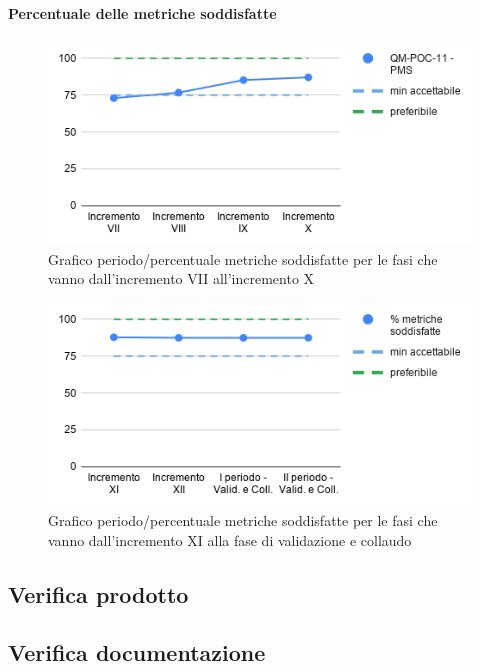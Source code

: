 \paragraph{Percentuale delle metriche soddisfatte}
	\begin{figure}[H]
			\centering
			\includegraphics[width=0.8\linewidth]{./res/images/QM-PROC-11-PMS.png}
			\caption{Grafico periodo/percentuale metriche soddisfatte per le fasi che vanno dall'incremento VII all'incremento X}
			\label{fig:Grafico periodo/percentuale metriche soddisfatte per le fasi che vanno dall'incremento VII all'incremento X}
	\end{figure}
	\begin{figure}[H]
			\centering
			\includegraphics[width=0.8\linewidth]{./res/images/QM-PROC-11-PMS_1.png}
			\caption{Grafico periodo/percentuale metriche soddisfatte per le fasi che vanno dall'incremento XI alla fase di validazione e collaudo}
			\label{fig:Grafico periodo/percentuale metriche soddisfatte per le fasi che vanno dall'incremento XI alla fase di validazione e collaudo}
	\end{figure}

\subsection{Verifica prodotto}


\subsection{Verifica documentazione}

